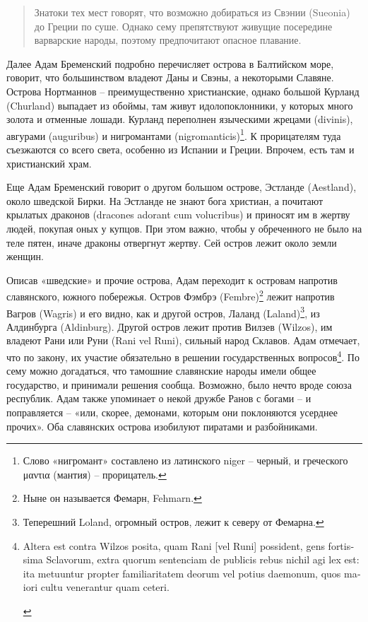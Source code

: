 \begin{quotation}
Знатоки тех мест говорят, что возможно добираться из Свэнии (Sueonia) до Греции по суше. Однако сему препятствуют живущие посередине варварские народы, поэтому предпочитают опасное плавание.
\end{quotation}

Далее Адам Бременский подробно перечисляет острова в Балтийском море, говорит, что большинством владеют Даны и Свэны, а некоторыми Славяне. Острова Нортманнов – преимущественно христианские, однако большой Курланд (Churland) выпадает из обоймы, там живут идолопоклонники, у которых много золота и отменные лошади. Курланд переполнен языческими жрецами (divinis), авгурами (auguribus) и нигромантами (nigromanticis)\footnote{Слово «нигромант» составлено из латинского niger – черный, и греческого μαντια (мантия) – прорицатель.}. К прорицателям туда съезжаются со всего света, особенно из Испании и Греции. Впрочем, есть там и христианский храм.

Еще Адам Бременский говорит о другом большом острове, Эстланде (Aestland), около шведской Бирки. На Эстланде не знают бога христиан, а почитают крылатых драконов (dracones adorant cum volucribus) и приносят им в жертву людей, покупая оных у купцов. При этом важно, чтобы у обреченного не было на теле пятен, иначе драконы отвергнут жертву. Сей остров лежит около земли женщин.

Описав «шведские» и прочие острова, Адам переходит к островам напротив славянского, южного побережья. Остров Фэмбрэ (Fembre)\footnote{Ныне он называется Фемарн, Fehmarn.} лежит напротив Вагров (Wagris) и его видно, как и другой остров, Лаланд (Laland)\footnote{Теперешний Loland, огромный остров, лежит к северу от Фемарна.}, из Алдинбурга (Aldinburg). Другой остров лежит против Вилзев (Wilzos), им владеют Рани или Руни (Rani vel Runi), сильный народ Склавов. Адам отмечает, что по закону, их участие обязательно в решении государственных вопросов\footnote{\begin{otherlanguage}{latin}Altera est contra Wilzos posita, quam Rani [vel Runi] possident, gens fortissima Sclavorum, extra quorum sentenciam de publicis rebus nichil agi lex est: ita metuuntur propter familiaritatem deorum vel potius daemonum, quos maiori cultu venerantur quam ceteri.\end{otherlanguage}}. По сему можно догадаться, что тамошние славянские народы имели общее государство, и принимали решения сообща. Возможно, было нечто вроде союза республик. Адам также упоминает о некой дружбе Ранов с богами – и поправляется – «или, скорее, демонами, которым они поклоняются усерднее прочих». Оба славянских острова изобилуют пиратами и разбойниками.

